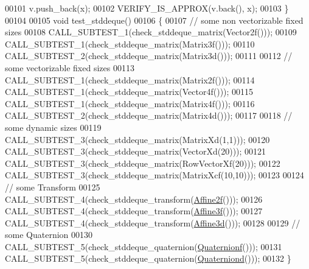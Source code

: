 \begin{DoxyCode}
00101   v.push\_back(x);
00102   VERIFY\_IS\_APPROX(v.back(), x);
00103 \}
00104 
00105 \textcolor{keywordtype}{void} test\_stddeque()
00106 \{
00107   \textcolor{comment}{// some non vectorizable fixed sizes}
00108   CALL\_SUBTEST\_1(check\_stddeque\_matrix(Vector2f()));
00109   CALL\_SUBTEST\_1(check\_stddeque\_matrix(Matrix3f()));
00110   CALL\_SUBTEST\_2(check\_stddeque\_matrix(Matrix3d()));
00111 
00112   \textcolor{comment}{// some vectorizable fixed sizes}
00113   CALL\_SUBTEST\_1(check\_stddeque\_matrix(Matrix2f()));
00114   CALL\_SUBTEST\_1(check\_stddeque\_matrix(Vector4f()));
00115   CALL\_SUBTEST\_1(check\_stddeque\_matrix(Matrix4f()));
00116   CALL\_SUBTEST\_2(check\_stddeque\_matrix(Matrix4d()));
00117 
00118   \textcolor{comment}{// some dynamic sizes}
00119   CALL\_SUBTEST\_3(check\_stddeque\_matrix(MatrixXd(1,1)));
00120   CALL\_SUBTEST\_3(check\_stddeque\_matrix(VectorXd(20)));
00121   CALL\_SUBTEST\_3(check\_stddeque\_matrix(RowVectorXf(20)));
00122   CALL\_SUBTEST\_3(check\_stddeque\_matrix(MatrixXcf(10,10)));
00123 
00124   \textcolor{comment}{// some Transform}
00125   CALL\_SUBTEST\_4(check\_stddeque\_transform(\hyperlink{group___geometry___module_ga2c1ea05a21899654ee3a2e3f91fa30e0}{Affine2f}()));
00126   CALL\_SUBTEST\_4(check\_stddeque\_transform(\hyperlink{group___geometry___module_ga17e901de8ff882aea7845c5457db6a4f}{Affine3f}()));
00127   CALL\_SUBTEST\_4(check\_stddeque\_transform(\hyperlink{group___geometry___module_gaaffa69d3143826efeb84e5d6c56a4c78}{Affine3d}()));
00128 
00129   \textcolor{comment}{// some Quaternion}
00130   CALL\_SUBTEST\_5(check\_stddeque\_quaternion(\hyperlink{group___geometry___module_ga785b13a5a87f9bf55d4eba51ead2dcf0}{Quaternionf}()));
00131   CALL\_SUBTEST\_5(check\_stddeque\_quaternion(\hyperlink{group___geometry___module_ga6e77eb8b6aae0e04be2db88107dbc642}{Quaterniond}()));
00132 \}
\end{DoxyCode}
